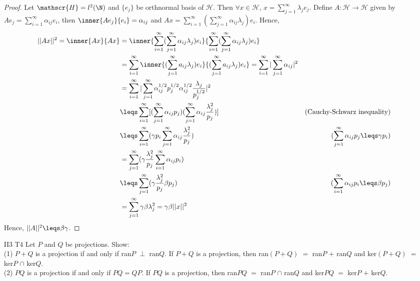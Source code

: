\begin{proof}
    Let $\mathscr{H}=l^2(\N)$ and $\{e_j\}$ be orthnormal basis of $\mathscr{H}$.
    Then $\forall x\in \mathscr{H}$, $x=\sum\limits_{j=1}^{\infty}\lambda_je_j$.
    Define $A:\mathscr{H}\rightarrow \mathscr{H}$ given by $Ae_j=\sum\limits_{i=1}^{\infty}\alpha_{ij}e_i$,
    then $\inner{Ae_j}{e_i}=\alpha_{ij}$ and $Ax=\sum\limits_{i=1}^{\infty}(\sum\limits_{j=1}^{\infty}\alpha_{ij}\lambda_j)e_i$. Hence,
    \begin{align*}
        ||Ax||^2=\inner{Ax}{Ax}&=\inner{\sum\limits_{i=1}^{\infty}(\sum\limits_{j=1}^{\infty}\alpha_{ij}\lambda_j)e_i}{\sum\limits_{i=1}^{\infty}(\sum\limits_{j=1}^{\infty}\alpha_{ij}\lambda_j)e_i}\\
                                &=\sum\limits_{i=1}^{\infty}\inner{(\sum\limits_{j=1}^{\infty}a_{ij}\lambda_j)e_i}{(\sum\limits_{j=1}^{\infty}a_{ij}\lambda_j)e_i}= \sum\limits_{i=1}^{\infty}|\sum\limits_{j=1}^{\infty}\alpha_{ij}|^2\\
                                &= \sum\limits_{i=1}^{\infty}|\sum\limits_{j=1}^{\infty}\alpha_{ij}^{1/2}p_j^{1/2}\alpha_{ij}^{1/2}\frac{\lambda_j}{p_j^{1/2}}|^2\\
                                &\leqs \sum\limits_{i=1}^{\infty}[(\sum\limits_{j=1}^{\infty}\alpha_{ij}p_j)(\sum\limits_{j=1}^{\infty}\alpha_{ij}\frac{\lambda_j^2}{p_j})] & (\text{Cauchy-Schwarz inequality})\\
                                &\leqs \sum\limits_{i=1}^{\infty}(\gamma p_i\sum\limits_{j=1}^{\infty} \alpha_{ij}\frac{\lambda_j^2}{p_j})&(\sum\limits_{j=1}^{\infty}\alpha_{ij}p_j \leqs \gamma p_i)\\
                                &=\sum\limits_{j=1}^{\infty}(\gamma \frac{\lambda_j^2}{p_j}\sum\limits_{i=1}^{\infty}\alpha_{ij}p_i)\\
                                &\leqs \sum\limits_{j=1}^{\infty} (\gamma \frac{\lambda_j^2}{p_j}\beta p_j)&(\sum\limits_{i=1}^{\infty}\alpha_{ij}p_i \leqs \beta p_j)\\
                                &=\sum\limits_{j=1}^{\infty}\gamma\beta\lambda_j^2=\gamma\beta||x||^2
    \end{align*}
    Hence, $||A||^2\leqs \beta\gamma$.
\end{proof}

\begin{exercise}{II3 T4}{}
    Let $P$ and $Q$ be projections. Show:\\
    (1) $P+Q$ is a projection if and only if ran$P$ $\perp$ ran$Q$.
    If $P+Q$ is a projection, then ran$(P+Q)$ $=$ ran$P$ $+$ ran$Q$ and 
    ker$(P+Q)$ $=$ ker$P$ $\cap$ ker$Q$.\\
    (2) $PQ$ is a projection if and only if $PQ=QP$.
    If $PQ$ is a projection, then ran$PQ$ $=$ ran$P$ $\cap$ ran$Q$ 
    and ker$PQ$ $=$ ker$P$ $+$ ker$Q$.
\end{exercise}

